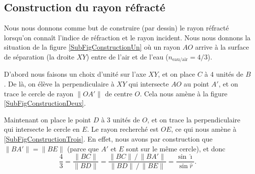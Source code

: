 \subsection{Construction du rayon réfracté}

Nous nous donnons comme but de construire (par dessin) le rayon réfracté lorsqu'on connaît l'indice de réfraction et le rayon incident. Nous nous donnons la situation de la figure \ref{SubFigConstructionUn} où un rayon $AO$ arrive à la surface de séparation (la droite $XY$) entre de l'air et de l'eau ($n_{\text{eau/air}}=4/3$).

D'abord nous faisons un choix d'unité sur l'axe $XY$, et on place $C$ à $4$ unités de $B$. De là, on élève la perpendiculaire à $XY$ qui intersecte $AO$ au point $A'$, et on trace le cercle de rayon $\| OA' \|$ de centre $O$. Cela nous amène à la figure \ref{SubFigConstructionDeux}.

Maintenant on place le point $D$ à $3$ unités de $O$, et on trace la perpendiculaire qui intersecte le cercle en $E$. Le rayon recherché est $OE$, ce qui nous amène à \ref{SubFigConstructionTrois}. En effet, nous avons par construction que $\| BA' \|=\| BE \|$ (parce que $A'$ et $E$ sont sur le même cercle), et donc
\[ 
  \frac{ 4 }{ 3 }=\frac{ \| BC \| }{ \| BD \| }=\frac{ \| BC \|\,/\,\| BA' \| }{ \| BD \|\,/\,\| BE \| }=\frac{ \sin\hat\imath }{ \sin\hat r }.
\]


\newcommand{\PreFigConstruction}{%
\pstGeonode(0,0){O}(2,0){P}
\pstRotation[RotAngle=90]{O}{P}[Qi]
\pstHomO[HomCoef=0.5]{O}{Qi}[Q]
\pstRotation[RotAngle=180]{O}{P}[R]
\pstHomO[HomCoef=-1]{O}{Q}[S]
\pstRotation[RotAngle=30]{O}{P}[Pi]		%
\pstHomO[HomCoef=1.5]{O}{Pi}[Pil]
\pstHomO[HomCoef=1.2]{O}{R}[Rl]
\pstHomO[HomCoef=1.2]{O}{P}[Pl]

\pstTransHom{O}{R}{Q}{1}{T}
\pstTransHom{O}{P}{S}{1}{U}

\pstDecompForce{O}{Pi}{O}{P}{O}{Q}{C}{C'}
\pstHomO[HomCoef=-0.75]{O}{C}[D]
\pstTransHom{O}{S}{D}{1}{El}
\pstInterLC{D}{El}{O}{Pi}{E'}{E}

    \pstDioptre{O}{P}{Pi}{1}{1.333}{Rs}{Re}	%
}

